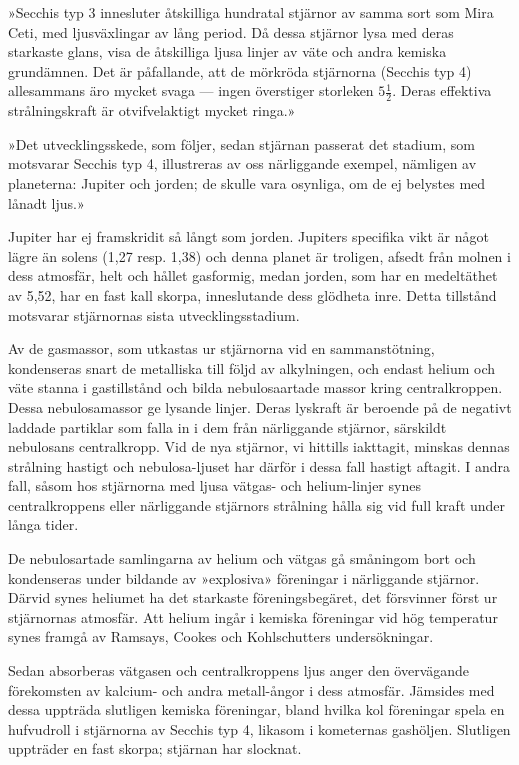 \documentclass[a4paper, 12pt, oneside, swedish]{article}
\begin{document}
»Secchis typ 3 innesluter åtskilliga hundratal stjärnor av samma sort som Mira Ceti, med ljusväxlingar av lång period. Då dessa stjärnor lysa med deras starkaste glans, visa de åtskilliga ljusa linjer av väte och andra kemiska grundämnen. Det är påfallande, att de mörkröda stjärnorna (Secchis typ 4) allesammans äro mycket svaga --- ingen överstiger storleken $5\frac{1}{2}$. Deras effektiva strålningskraft är otvifvelaktigt mycket ringa.»

»Det utvecklingsskede, som följer, sedan stjärnan passerat det stadium, som motsvarar Secchis typ 4, illustreras av oss närliggande exempel, nämligen av planeterna: Jupiter och jorden; de skulle vara osynliga, om de ej belystes med lånadt ljus.»

Jupiter har ej framskridit så långt som jorden. Jupiters specifika vikt är något lägre än solens (1,27 resp. 1,38) och denna planet är troligen, afsedt från molnen i dess atmosfär, helt och hållet gasformig, medan jorden, som har en medeltäthet av 5,52, har en fast kall skorpa, inneslutande dess glödheta inre. Detta tillstånd motsvarar stjärnornas sista utvecklingsstadium.

Av de gasmassor, som utkastas ur stjärnorna vid en sammanstötning, kondenseras snart de metalliska till följd av alkylningen, och endast helium och väte stanna i gastillstånd och bilda nebulosaartade massor kring centralkroppen. Dessa nebulosamassor ge lysande linjer. Deras lyskraft är beroende på de negativt laddade partiklar som falla in i dem från närliggande stjärnor, särskildt nebulosans centralkropp. Vid de nya stjärnor, vi hittills iakttagit, minskas dennas strålning hastigt och nebulosa-ljuset har därför i dessa fall hastigt aftagit. I andra fall, såsom hos stjärnorna med ljusa vätgas- och helium-linjer synes centralkroppens eller närliggande stjärnors strålning hålla sig vid full kraft under långa tider.

De nebulosartade samlingarna av helium och vätgas gå småningom bort och kondenseras under bildande av »explosiva» föreningar i närliggande stjärnor. Därvid synes heliumet ha det starkaste föreningsbegäret, det försvinner först ur stjärnornas atmosfär. Att helium ingår i kemiska föreningar vid hög temperatur synes framgå av Ramsays, Cookes och Kohlschutters undersökningar.

Sedan absorberas vätgasen och centralkroppens ljus anger den övervägande förekomsten av kalcium- och andra metall-ångor i dess atmosfär. Jämsides med dessa uppträda slutligen kemiska föreningar, bland hvilka kol föreningar spela en hufvudroll i stjärnorna av Secchis typ 4, likasom i kometernas gashöljen. Slutligen uppträder en fast skorpa; stjärnan har slocknat.
\clearpage
\end{document}

